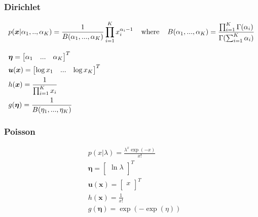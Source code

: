 \subsubsection{Dirichlet}
\begin{fleqn}[\parindent]
	\begin{equation*}
	\begin{split}
	& p(\bm{x}|\alpha_1,..,\alpha_K) = \frac{1}{B(\alpha_1,..., \alpha_K)}\prod_{i=1}^{K}x_i^{\alpha_i-1} \hspace{4mm}\text{where}\hspace{4mm}B(\alpha_1,...,\alpha_K)=\frac{\prod_{i=1}^{K}\Gamma(\alpha_i)}{\Gamma(\sum_{i=1}^{K} \alpha_i)}\\[8pt]
	& \bm{\eta} = \begin{bmatrix}
	\alpha_1 & ... & \alpha_K\\
	\end{bmatrix}^T\\
	& \bm{u}(\bm{x}) = \begin{bmatrix}
	\log x_1 & ... & \log x_K\\
	\end{bmatrix}^T\\
	& h(\bm{x}) = \frac{1}{\prod_{i=1}^{K}x_i}\\
	& g(\bm{\eta}) = \frac{1}{B(\eta_1, ..., \eta_K)}\\
	\end{split}
	\end{equation*}
\end{fleqn}
\subsubsection{Poisson}
\begin{fleqn}[\parindent]
	\begin{equation*}
	\begin{split}
	& p(x|\lambda) = \frac{\lambda^{x}\exp(-x)}{x!}\\[8pt]
	& \bm{\eta} = \begin{bmatrix}
	\ln \lambda \\
	\end{bmatrix}^T\\
	& \bm{u}(\bm{x}) = \begin{bmatrix}
	x\\
	\end{bmatrix}^T\\
	& h(\bm{x}) = \frac{1}{x!}\\
	& g(\bm{\eta}) = \exp(-\exp(\eta))\\
	\end{split}
	\end{equation*}
\end{fleqn}

